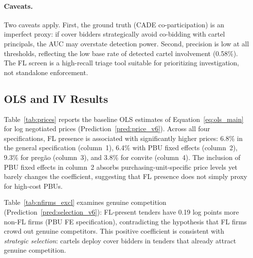 \paragraph{Caveats.}
Two caveats apply. First, the ground truth (CADE co-participation)
is an imperfect proxy: if cover bidders strategically avoid
co-bidding with cartel principals, the AUC may overstate detection
power. Second, precision is low at all thresholds, reflecting the
low base rate of detected cartel involvement (0.58\%). The FL
screen is a high-recall triage tool suitable for prioritizing
investigation, not standalone enforcement.


\subsection{OLS and IV Results}
\label{sec:results_ols}

Table~\ref{tab:prices} reports the baseline OLS estimates of
Equation~\eqref{eq:ols_main} for log negotiated prices
(Prediction~\ref{pred:price_v6}). Across all four
specifications, FL presence is associated with significantly higher
prices: 6.8\% in the general specification (column~1), 6.4\% with PBU
fixed effects (column~2), 9.3\% for preg\~ao (column~3), and 3.8\% for
convite (column~4). The inclusion of PBU fixed effects in column~2
absorbs purchasing-unit-specific price levels yet barely changes the
coefficient, suggesting that FL presence does not simply proxy for
high-cost PBUs.



Table~\ref{tab:nfirms_excl} examines genuine competition
(Prediction~\ref{pred:selection_v6}): FL-present
tenders have 0.19 log points more non-FL firms (PBU FE specification),
contradicting the hypothesis that FL firms crowd out genuine competitors.
This positive coefficient is consistent with \emph{strategic selection}:
cartels deploy cover bidders in tenders that already attract genuine
competition.



